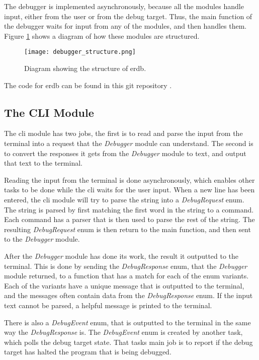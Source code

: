 The debugger is implemented asynchronously, because all the modules handle input, either from the user or from the debug target.
Thus, the main function of the debugger waits for input from any of the modules, and then handles them.
Figure \ref{fig:ERDStruct} shows a diagram of how these modules are structured.


\begin{figure}[h]
	\centering
	\texttt{[image: debugger\_structure.png]}
	\caption{Diagram showing the structure of \gls{erdb}.}
	\label{fig:ERDStruct}
\end{figure}


The code for \gls{erdb} can be found in this git repository \cite{erdb}.


\subsection{The CLI Module} 
The \acrshort{cli} module has two jobs, the first is to read and parse the input from the terminal into a request that the \emph{Debugger} module can understand.
The second is to convert the responses it gets from the \emph{Debugger} module to text, and output that text to the terminal.


Reading the input from the terminal is done asynchronously, which enables other tasks to be done while the \acrshort{cli} waits for the user input.
When a new line has been entered, the \acrshort{cli} module will try to parse the string into a \emph{DebugRequest} enum.
The string is parsed by first matching the first word in the string to a command.
Each command has a parser that is then used to parse the rest of the string.
The resulting \emph{DebugRequest} enum is then return to the main function, and then sent to the \emph{Debugger} module.



After the \emph{Debugger} module has done its work, the result it outputted to the terminal.
This is done by sending the \emph{DebugResponse} enum, that the \emph{Debugger} module returned, to a function that has a match for each of the enum variants.
Each of the variants have a unique message that is outputted to the terminal, and the messages often contain data from the \emph{DebugResponse} enum.
If the input text cannot be parsed, a helpful message is printed to the terminal.



There is also a \emph{DebugEvent} enum, that is outputted to the terminal in the same way the \emph{DebugResponse} is.
The \emph{DebugEvent} enum is created by another task, which polls the debug target state.
That tasks main job is to report if the debug target has halted the program that is being debugged.



